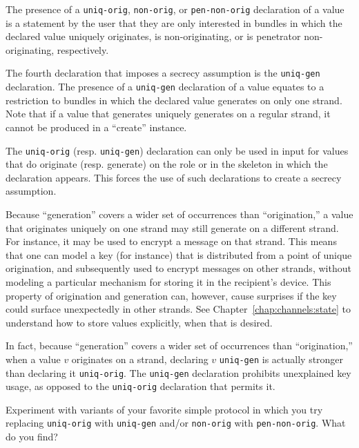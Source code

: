    The
presence of a \texttt{uniq-orig}, \texttt{non-orig}, or
\texttt{pen-non-orig} declaration of a value is a statement by the
user that they are only interested in bundles in which the declared
value uniquely originates, is non-originating, or is penetrator
non-originating, respectively.

 The fourth declaration that imposes a secrecy
assumption is the \texttt{uniq-gen} declaration.  The presence of a
\texttt{uniq-gen} declaration of a value equates to a restriction to
bundles in which the declared value generates on only one strand.
Note that if a value that generates uniquely generates on a regular
strand, it cannot be produced in a ``create'' instance.

The \texttt{uniq-orig} (resp. \texttt{uniq-gen}) declaration can only
be used in {\cpsa} input for values that do originate (resp. generate)
on the role or in the skeleton in which the declaration appears.  This
forces the use of such declarations to create a secrecy assumption.

Because ``generation'' covers a wider set of occurrences than
``origination,'' a value that originates uniquely on one strand may
still generate on a different strand.  For instance, it may be used to
encrypt a message on that strand.  This means that one can model a key
(for instance) that is distributed from a point of unique origination,
and subsequently used to encrypt messages on other strands, without
modeling a particular mechanism for storing it in the recipient's
device.  This property of origination and generation can, however,
cause surprises if the key could surface unexpectedly in other
strands.  See Chapter~\ref{chap:channels:state} to understand how to
store values explicitly, when that is desired.

In fact, because ``generation'' covers a wider set of occurrences than
``origination,'' when a value $v$ originates on a strand, declaring
$v$ \texttt{uniq-gen} is actually stronger than declaring it
\texttt{uniq-orig}.  The \texttt{uniq-gen} declaration prohibits
unexplained key usage, as opposed to the \texttt{uniq-orig}
declaration that permits it.  

\begin{exercise}
Experiment with variants of your favorite simple protocol in which you
try replacing \texttt{uniq-orig} with \texttt{uniq-gen} and/or
\texttt{non-orig} with \texttt{pen-non-orig}.  What do you find?
\end{exercise}

